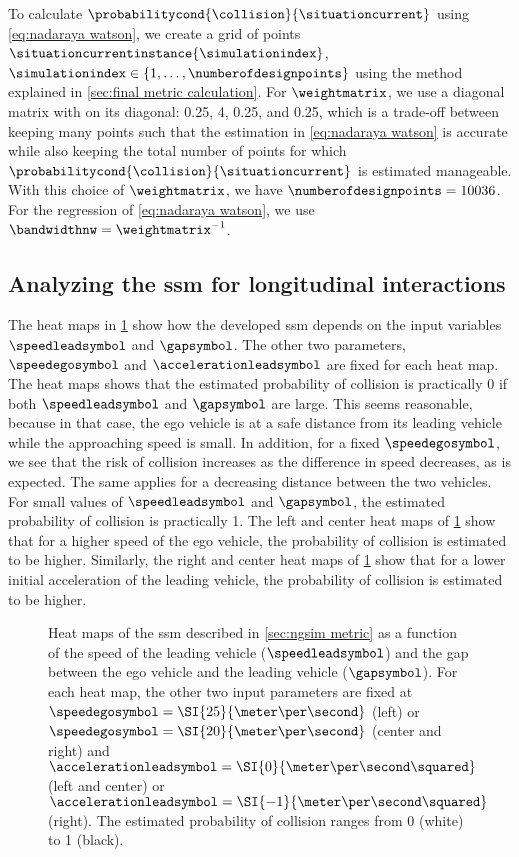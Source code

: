 To calculate $\probabilitycond{\collision}{\situationcurrent}$ using \cref{eq:nadaraya watson}, we create a grid of points $\situationcurrentinstance{\simulationindex}$, $\simulationindex\in\{1,\ldots,\numberofdesignpoints\}$ using the method explained in \cref{sec:final metric calculation}.
For $\weightmatrix$, we use a diagonal matrix with on its diagonal: 0.25, 4, 0.25, and 0.25, \cstartb which is a trade-off between keeping many points such that the estimation in \cref{eq:nadaraya watson} is accurate while also keeping the total number of points for which $\probabilitycond{\collision}{\situationcurrent}$ is estimated manageable.
With this choice of $\weightmatrix$, we have $\numberofdesignpoints=10036$. \cendb
For the regression of \cref{eq:nadaraya watson}, we use $\bandwidthnw=\weightmatrix^{-1}$.



\subsection{Analyzing the \acs{ssm} for longitudinal interactions}
\label{sec:analyzing ngsim metric}

The heat maps in \cref{fig:heatmaps} show how the developed \ac{ssm} depends on the input variables $\speedleadsymbol$ and $\gapsymbol$. 
The other two parameters, $\speedegosymbol$ and $\accelerationleadsymbol$ are fixed for each heat map.
The heat maps shows that the estimated probability of collision is practically 0 if both $\speedleadsymbol$ and $\gapsymbol$ are large.
This seems reasonable, because in that case, the ego vehicle is at a safe distance from its leading vehicle while the approaching speed is small. 
\cstartb In addition, for a fixed $\speedegosymbol$, we see that the risk of collision increases as the difference in speed decreases, as is expected. \cendb
The same applies for a decreasing distance between the two vehicles.
For small values of $\speedleadsymbol$ and $\gapsymbol$, the estimated probability of collision is practically 1.
The left and center heat maps of \cref{fig:heatmaps} show that for a higher speed of the ego vehicle, the probability of collision is estimated to be higher.
Similarly, the right and center heat maps of \cref{fig:heatmaps} show that for a lower initial acceleration of the leading vehicle, the probability of collision is estimated to be higher.

\setlength{\figurewidth}{.35\linewidth}
\setlength{\figureheight}{0.8\figurewidth}
\begin{figure}
	\centering
	
	\caption{Heat maps of the \ac{ssm} described in \cref{sec:ngsim metric} as a function of the speed of the leading vehicle ($\speedleadsymbol$) and the gap between the ego vehicle and the leading vehicle ($\gapsymbol$).
		For each heat map, the other two input parameters are fixed at $\speedegosymbol=\SI{25}{\meter\per\second}$ (left) or $\speedegosymbol=\SI{20}{\meter\per\second}$ (center and right) and $\accelerationleadsymbol=\SI{0}{\meter\per\second\squared}$ (left and center) or $\accelerationleadsymbol=\SI{-1}{\meter\per\second\squared}$ (right).
		The estimated probability of collision ranges from 0 (white) to 1 (black).}
	\label{fig:heatmaps}
\end{figure}

